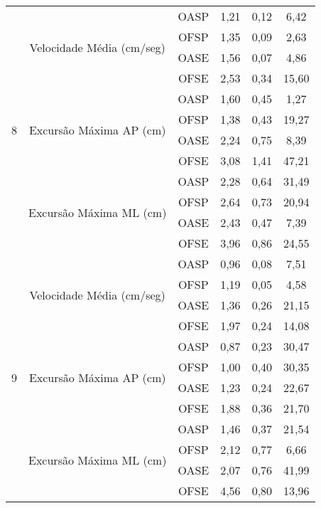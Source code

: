 \begin{apendicesenv}
\begin{table}[ht]
\begin{tabular}{|c|c|c|c|c|c|}
\multirow{12}{*}{8} & \multirow{4}{*}{Velocidade Média (cm/seg)} & OASP & 1,21 & 0,12 & 6,42 \\ \cline{3-6} 
 &  & OFSP & 1,35 & 0,09 & 2,63 \\ \cline{3-6} 
 &  & OASE & 1,56 & 0,07 & 4,86 \\ \cline{3-6} 
 &  & OFSE & 2,53 & 0,34 & 15,60 \\ \cline{2-6} 
 & \multirow{4}{*}{Excursão Máxima AP (cm)} & OASP & 1,60 & 0,45 & 1,27 \\ \cline{3-6} 
 &  & OFSP & 1,38 & 0,43 & 19,27 \\ \cline{3-6} 
 &  & OASE & 2,24 & 0,75 & 8,39 \\ \cline{3-6} 
 &  & OFSE & 3,08 & 1,41 & 47,21 \\ \cline{2-6} 
 & \multirow{4}{*}{Excursão Máxima ML (cm)} & OASP & 2,28 & 0,64 & 31,49 \\ \cline{3-6} 
 &  & OFSP & 2,64 & 0,73 & 20,94 \\ \cline{3-6} 
 &  & OASE & 2,43 & 0,47 & 7,39 \\ \cline{3-6} 
 &  & OFSE & 3,96 & 0,86 & 24,55 \\ \hline
\multirow{12}{*}{9} & \multirow{4}{*}{Velocidade Média (cm/seg)} & OASP & 0,96 & 0,08 & 7,51 \\ \cline{3-6} 
 &  & OFSP & 1,19 & 0,05 & 4,58 \\ \cline{3-6} 
 &  & OASE & 1,36 & 0,26 & 21,15 \\ \cline{3-6} 
 &  & OFSE & 1,97 & 0,24 & 14,08 \\ \cline{2-6} 
 & \multirow{4}{*}{Excursão Máxima AP (cm)} & OASP & 0,87 & 0,23 & 30,47 \\ \cline{3-6} 
 &  & OFSP & 1,00 & 0,40 & 30,35 \\ \cline{3-6} 
 &  & OASE & 1,23 & 0,24 & 22,67 \\ \cline{3-6} 
 &  & OFSE & 1,88 & 0,36 & 21,70 \\ \cline{2-6} 
 & \multirow{4}{*}{Excursão Máxima ML (cm)} & OASP & 1,46 & 0,37 & 21,54 \\ \cline{3-6} 
 &  & OFSP & 2,12 & 0,77 & 6,66 \\ \cline{3-6} 
 &  & OASE & 2,07 & 0,76 & 41,99 \\ \cline{3-6} 
 &  & OFSE & 4,56 & 0,80 & 13,96 \\ \hline
\end{tabular}
\end{table}
\addtocounter{footnote}{-4} %





\end{apendicesenv}
